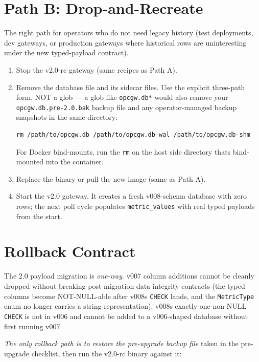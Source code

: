 \section{Path B: Drop-and-Recreate}\label{sec-upgrade-path-b}

The right path for operators who do not need legacy history (test deployments, dev gateways, or production gateways where historical rows are uninteresting under the new typed-payload contract).

\begin{enumerate}
\def\labelenumi{\arabic{enumi}.}
\item
  Stop the v2.0-rc gateway (same recipes as Path A).
\item
  Remove the database file and its sidecar files. Use the explicit three-path form, NOT a glob --- a glob like \texttt{opcgw.db*} would also remove your \texttt{opcgw.db.pre-2.0.bak} backup file and any operator-managed backup snapshots in the same directory:

\begin{lstlisting}
rm /path/to/opcgw.db /path/to/opcgw.db-wal /path/to/opcgw.db-shm
\end{lstlisting}

  For Docker bind-mounts, run the \texttt{rm} on the host side directory that\textquotesingle s bind-mounted into the container.
\item
  Replace the binary or pull the new image (same as Path A).
\item
  Start the v2.0 gateway. It creates a fresh v008-schema database with zero rows; the next poll cycle populates \texttt{metric\_values} with real typed payloads from the start.
\end{enumerate}

\section{Rollback Contract}\label{sec-upgrade-rollback}

The 2.0 payload migration is \emph{one-way}. v007 column additions cannot be cleanly dropped without breaking post-migration data integrity contracts (the typed columns become NOT-NULL-able after v008\textquotesingle s \texttt{CHECK} lands, and the \texttt{MetricType} enum no longer carries a string representation). v008\textquotesingle s exactly-one-non-NULL \texttt{CHECK} is not in v006 and cannot be added to a v006-shaped database without first running v007.

\emph{The only rollback path is to restore the pre-upgrade backup file} taken in the pre-upgrade checklist, then run the v2.0-rc binary against it:

